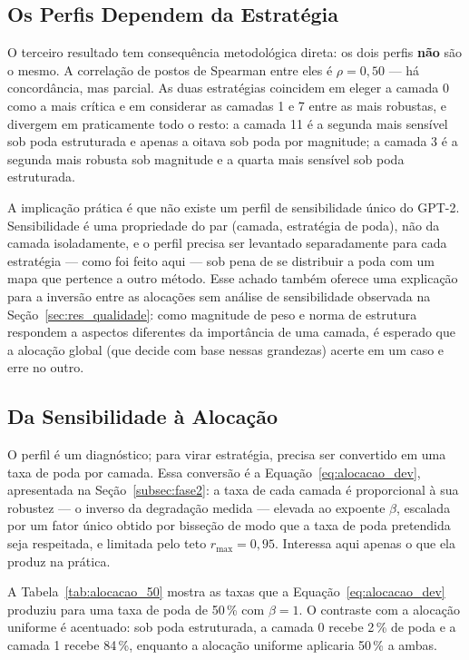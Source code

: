 \subsection{Os Perfis Dependem da Estratégia}\label{subsec:perfis_divergem}

O terceiro resultado tem consequência metodológica direta: os dois perfis
\textbf{não} são o mesmo. A correlação de postos de Spearman entre eles é
$\rho = 0{,}50$ --- há concordância, mas parcial. As duas estratégias
coincidem em eleger a camada 0 como a mais crítica e em considerar as camadas
1 e 7 entre as mais robustas, e divergem em praticamente todo o resto: a
camada 11 é a segunda mais sensível sob poda estruturada e apenas a oitava sob
poda por magnitude; a camada 3 é a segunda mais robusta sob magnitude e a
quarta mais sensível sob poda estruturada.

A implicação prática é que não existe um perfil de sensibilidade único do
GPT-2. Sensibilidade é uma propriedade do par (camada, estratégia de poda),
não da camada isoladamente, e o perfil precisa ser levantado separadamente
para cada estratégia --- como foi feito aqui --- sob pena de se distribuir a
poda com um mapa que pertence a outro método. Esse achado também oferece
uma explicação para a inversão entre as alocações sem análise de sensibilidade
observada na Seção~\ref{sec:res_qualidade}: como magnitude de peso e norma de estrutura
respondem a aspectos diferentes da importância de uma camada, é esperado que a alocação
global (que decide com base nessas grandezas) acerte em um caso e erre no outro.

\subsection{Da Sensibilidade à Alocação}\label{subsec:alocacao}

O perfil é um diagnóstico; para virar estratégia, precisa ser convertido em
uma taxa de poda por camada. Essa conversão é a Equação~\ref{eq:alocacao_dev},
apresentada na Seção~\ref{subsec:fase2}: a taxa de cada camada é proporcional
à sua robustez --- o inverso da degradação medida --- elevada ao expoente
$\beta$, escalada por um fator único obtido por bisseção de modo que a
taxa de poda pretendida seja respeitada, e limitada pelo teto $r_{\max} = 0{,}95$.
Interessa aqui apenas o que ela produz na prática.

A Tabela~\ref{tab:alocacao_50} mostra as taxas que a
Equação~\ref{eq:alocacao_dev} produziu para uma taxa de poda de 50\,\% com
$\beta = 1$. O contraste com a alocação uniforme é acentuado: sob poda
estruturada, a camada 0 recebe 2\,\% de poda e a camada 1 recebe 84\,\%,
enquanto a alocação uniforme aplicaria 50\,\% a ambas.

